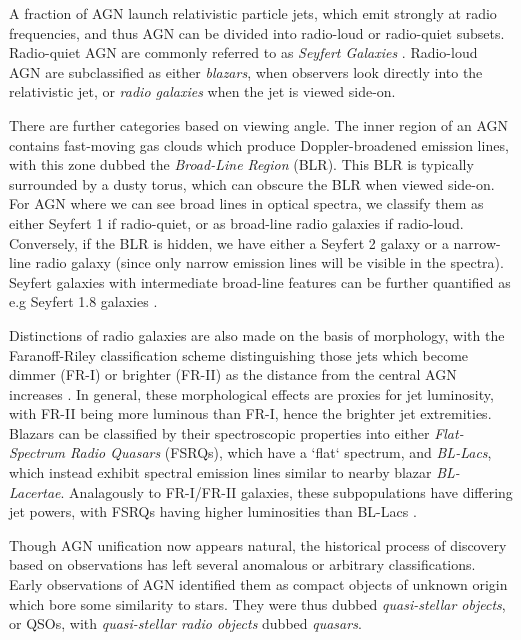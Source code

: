 A fraction of AGN launch relativistic particle jets, which emit strongly at radio frequencies, and thus AGN can be divided into radio-loud or radio-quiet subsets. Radio-quiet AGN are commonly referred to as \emph{Seyfert Galaxies} . Radio-loud AGN are subclassified as either \emph{blazars}, when observers look directly into the relativistic jet, or \emph{radio galaxies} when the jet is viewed side-on.

There are further categories based on viewing angle. The inner region of an AGN contains fast-moving gas clouds which produce Doppler-broadened emission lines, with this zone dubbed the \emph{Broad-Line Region} (BLR). This BLR is typically surrounded by a dusty torus, which can obscure the BLR when viewed side-on. For AGN where we can see broad lines in optical spectra, we classify them as either Seyfert 1 if radio-quiet, or as broad-line radio galaxies if radio-loud. Conversely, if the BLR is hidden, we have either a Seyfert 2 galaxy or a narrow-line radio galaxy (since only narrow emission lines will be visible in the spectra). Seyfert galaxies with intermediate broad-line features can be further quantified as e.g Seyfert 1.8 galaxies .

Distinctions of radio galaxies are also made on the basis of morphology, with the Faranoff-Riley classification scheme distinguishing those jets which become dimmer (FR-I) or brighter (FR-II) as the distance from the central AGN increases . In general, these morphological effects are proxies for jet luminosity, with FR-II being more luminous than FR-I, hence the brighter jet extremities. Blazars can be classified by their spectroscopic properties into either \emph{Flat-Spectrum Radio Quasars} (FSRQs), which have a `flat` spectrum, and \emph{BL-Lacs}, which instead exhibit spectral emission lines similar to nearby blazar \emph{BL-Lacertae}. Analagously to FR-I/FR-II galaxies, these subpopulations have differing jet powers, with FSRQs having higher luminosities than BL-Lacs .

Though AGN unification now appears natural, the historical process of discovery based on observations has left several anomalous or arbitrary classifications. Early observations of AGN identified them as compact objects of unknown origin which bore some similarity to stars. They were thus dubbed \emph{quasi-stellar objects}, or QSOs, with \emph{quasi-stellar radio objects} dubbed \emph{quasars}. 

